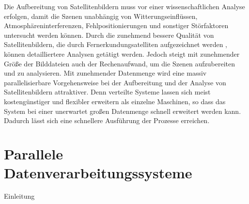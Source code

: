 Die Aufbereitung von Satellitenbildern muss vor einer wissenschaftlichen Analyse erfolgen, damit die Szenen unabhängig von Witterungseinflüssen, Atmosphäreninterferenzen, Fehlpositionierungen und sonstiger Störfaktoren untersucht werden können. Durch die zunehmend bessere Qualität von Satellitenbildern, die durch Fernerkundungsatelliten aufgezeichnet werden \cite{Markham2004}, können detailliertere Analysen getätigt werden. Jedoch steigt mit zunehmender Größe der Bilddateien auch der Rechenaufwand, um die Szenen aufzubereiten und zu analysieren. Mit zunehmender Datenmenge wird eine massiv parallelisierbare Vorgehensweise bei der Aufbereitung und der Analyse von Satellitenbildern attraktiver. Denn verteilte Systeme lassen sich meist kostengünstiger und flexibler erweitern als einzelne Maschinen, so dass das System bei einer unerwartet großen Datenmenge schnell erweitert werden kann. Dadurch lässt sich eine schnellere Ausführung der Prozesse erreichen.


\section{Parallele Datenverarbeitungssysteme}

Einleitung

